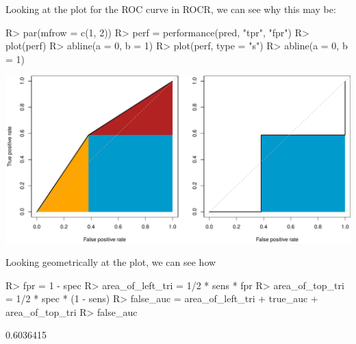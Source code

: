 \documentclass[article]{jss}
\begin{document}
Looking at the plot for the ROC curve in ROCR, we can see why this may
be:

\begin{CodeChunk}

\begin{CodeInput}
R> par(mfrow = c(1, 2))
R> perf = performance(pred, "tpr", "fpr")
R> plot(perf)
R> abline(a = 0, b = 1)
R> plot(perf, type = "s")
R> abline(a = 0, b = 1)
\end{CodeInput}
\end{CodeChunk}

\begin{CodeChunk}


\begin{center}\includegraphics{index_files/figure-latex/unnamed-chunk-7-1} \end{center}

\end{CodeChunk}

Looking geometrically at the plot, we can see how

\begin{CodeChunk}

\begin{CodeInput}
R> fpr = 1 - spec
R> area_of_left_tri = 1/2 * sens * fpr
R> area_of_top_tri = 1/2 * spec * (1 - sens)
R> false_auc = area_of_left_tri + true_auc + area_of_top_tri
R> false_auc
\end{CodeInput}

\begin{CodeOutput}
[1] 0.6036415
\end{CodeOutput}
\end{CodeChunk}


\end{document}

